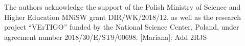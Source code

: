 \documentclass[%
 reprint,
groupedaddress,
nofootinbib,
nobibnotes,
 amsmath,amssymb,
 aps,
]{revtex4-2}
\newcommand{\<}{\langle}
\renewcommand{\>}{\rangle}
\newcommand{\MJ}[1]{\textcolor{WildStrawberry}{[Mariana]: #1}}
\begin{document}
\begin{acknowledgments}

The authors acknowledge the support of the Polish Ministry of Science and Higher Education MNiSW grant DIR/WK/2018/12, as well as the research project “VErTIGO” funded by the National Science Center, Poland, under agreement number 2018/30/E/ST9/00698.
\MJ{Add 2RJS}

\end{acknowledgments}

\end{document}
